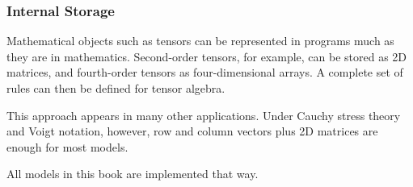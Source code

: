 \subsubsection{Internal Storage}
Mathematical objects such as tensors can be represented in programs much as they are in mathematics.
Second-order tensors, for example, can be stored as 2D matrices, and fourth-order tensors as four-dimensional arrays.
A complete set of rules can then be defined for tensor algebra.

This approach appears in many other applications.
Under Cauchy stress theory and Voigt notation, however, row and column vectors plus 2D matrices are enough for most models.

All models in this book are implemented that way.
